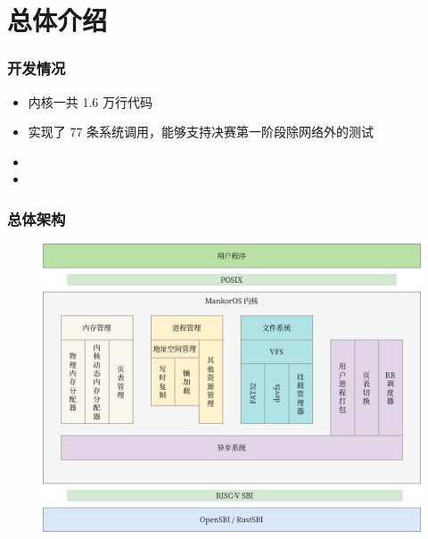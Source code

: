 \section{总体介绍}

\begin{frame}
    \frametitle{开发情况}

    \begin{itemize}
        \item 内核一共 1.6 万行代码
        \item 实现了 77 条系统调用，能够支持决赛第一阶段除网络外的测试
        \item {}
        \item {}
    \end{itemize}

\end{frame}

\begin{frame}
    \frametitle{总体架构}
    \begin{figure}
        \includegraphics[width=.6\textwidth]{assets/Arch.jpg}
    \end{figure}

\end{frame}

